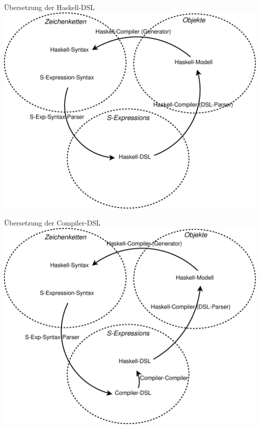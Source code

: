 \documentclass{beamer}
\begin{document}
\begin{frame}[fragile]{Übersetzung der Haskell-DSL}
  \includegraphics[scale=0.26]{images/magicl_hask_compiler}
\end{frame}

\begin{frame}{Übersetzung der Compiler-DSL}
  \includegraphics[scale=0.26]{images/magicl_comp_compiler}
\end{frame}
\end{document}
